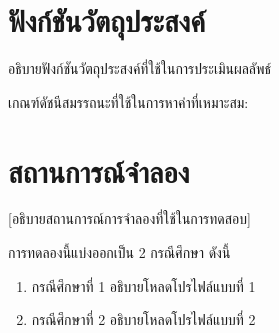 

\section{ฟังก์ชันวัตถุประสงค์}

\noindent\hspace{\parindent}%
อธิบายฟังก์ชันวัตถุประสงค์ที่ใช้ในการประเมินผลลัพธ์

เกณฑ์ดัชนีสมรรถนะที่ใช้ในการหาค่าที่เหมาะสม:





\section{สถานการณ์จำลอง}

\noindent\hspace{\parindent}%
[อธิบายสถานการณ์การจำลองที่ใช้ในการทดสอบ]

การทดลองนี้แบ่งออกเป็น 2 กรณีศึกษา ดังนี้
\begin{enumerate}
  \item กรณีศึกษาที่ 1 อธิบายโหลดโปรไฟล์แบบที่ 1
  \item กรณีศึกษาที่ 2 อธิบายโหลดโปรไฟล์แบบที่ 2
\end{enumerate}

